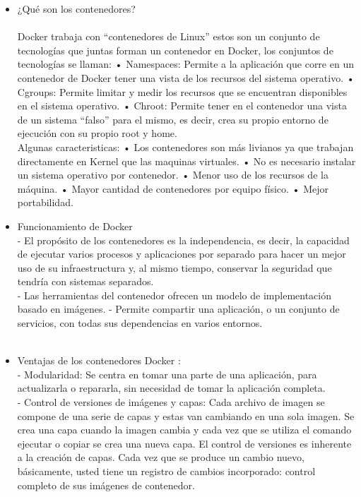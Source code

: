 \begin {itemize}
	\item ¿Qué son los contenedores?\\\\
	Docker trabaja con “contenedores de Linux” estos son un conjunto de tecnologías que juntas forman un contenedor en Docker, los conjuntos de tecnologías se llaman:
	\subitem • Namespaces: Permite a la aplicación que corre en un contenedor de Docker tener una vista de los recursos del sistema operativo.
	\subitem • Cgroups: Permite limitar y medir los recursos que se encuentran disponibles en el sistema operativo.
	\subitem • Chroot: Permite tener en el contenedor una vista de un sistema “falso” para el mismo, es decir, crea su propio entorno de ejecución con su propio root y home. \\
	Algunas caracteristicas: 
\subitem • Los contenedores son más livianos ya que trabajan directamente en Kernel que las maquinas virtuales.
\subitem • No es necesario instalar un sistema operativo por contenedor.
\subitem • Menor uso de los recursos de la máquina.
\subitem • Mayor cantidad de contenedores por equipo físico.
\subitem • Mejor portabilidad.\\
	\item Funcionamiento de Docker\\
	\subitem - El propósito de los contenedores es la independencia, es decir, la capacidad de ejecutar varios procesos y aplicaciones por separado para hacer un mejor uso de su infraestructura y, al mismo tiempo, conservar la seguridad que tendría con sistemas separados.\\
	\subitem - Las herramientas del contenedor ofrecen un modelo de implementación basado en imágenes.
	\subitem - Permite compartir una aplicación, o un conjunto de servicios, con todas sus dependencias en varios entornos. \\\\
	\item Ventajas de los contenedores Docker :\\
	\subitem - Modularidad: Se centra en tomar una parte de una aplicación, para actualizarla o repararla, sin necesidad de tomar la aplicación completa.\\
	\subitem - Control de versiones de imágenes y capas: Cada archivo de imagen se compone de una serie de capas y estas van cambiando en una sola imagen. Se crea una capa cuando la imagen cambia y cada vez que se utiliza el comando ejecutar o copiar se crea una nueva capa. 
El control de versiones es inherente a la creación de capas. Cada vez que se produce un cambio nuevo, básicamente, usted tiene un registro de cambios incorporado: control completo de sus imágenes de contenedor.

\end{itemize}
